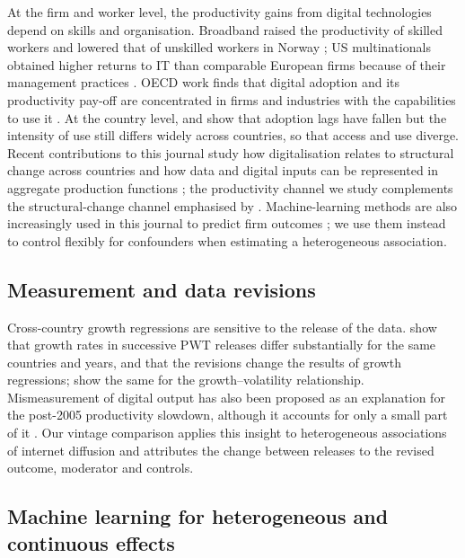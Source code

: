\documentclass[preprint,12pt,authoryear]{elsarticle}
\begin{document}
At the firm and worker level, the productivity gains from digital technologies depend on skills and organisation. Broadband raised the productivity of skilled workers and lowered that of unskilled workers in Norway \citep{akerman2015broadband}; US multinationals obtained higher returns to IT than comparable European firms because of their management practices \citep{bloom2012americans}. OECD work finds that digital adoption and its productivity pay-off are concentrated in firms and industries with the capabilities to use it \citep{gal2019digitalisation,nicoletti2020diffusion}. At the country level, \citet{comin2010diffusion} and \citet{comin2018diffusion} show that adoption lags have fallen but the intensity of use still differs widely across countries, so that access and use diverge. Recent contributions to this journal study how digitalisation relates to structural change across countries \citep{banga2026digitalisation} and how data and digital inputs can be represented in aggregate production functions \citep{chen2026production}; the productivity channel we study complements the structural-change channel emphasised by \citet{banga2026digitalisation}. Machine-learning methods are also increasingly used in this journal to predict firm outcomes \citep{xu2026carbon}; we use them instead to control flexibly for confounders when estimating a heterogeneous association.

\subsection{Measurement and data revisions}

Cross-country growth regressions are sensitive to the release of the data. \citet{johnson2013newer} show that growth rates in successive PWT releases differ substantially for the same countries and years, and that the revisions change the results of growth regressions; \citet{ponomareva2010pwt} show the same for the growth--volatility relationship. Mismeasurement of digital output has also been proposed as an explanation for the post-2005 productivity slowdown, although it accounts for only a small part of it \citep{byrne2016mismeasurement,syverson2017mismeasurement}. Our vintage comparison applies this insight to heterogeneous associations of internet diffusion and attributes the change between releases to the revised outcome, moderator and controls.

\subsection{Machine learning for heterogeneous and continuous effects}
\end{document}
